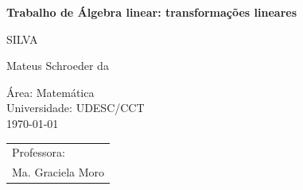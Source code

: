 \documentclass[english,ngerman,parskip=half]{scrartcl}
\begin{document}

    \begin{titlepage}
        \vspace*{-3cm}

        \vspace*{5cm}
    \begin{center}
        \Huge\bfseries\sffamily Trabalho de Álgebra linear: transformações lineares

        \vspace*{2cm}
        \large 
        SILVA

        Mateus Schroeder da
    \end{center}

    \enlargethispage{3cm}
    \vfill
    \parbox[t]{0.45\textwidth}{%
                Área: Matemática \\
                    Universidade: UDESC/CCT \\
                    {\today}
                          }%
                          \hfill
                          \begin{tabular}[t]{l@{}}%
                              Professora:\\
                                Ma. Graciela Moro
                              \end{tabular}
                          \end{titlepage}
\end{document}
